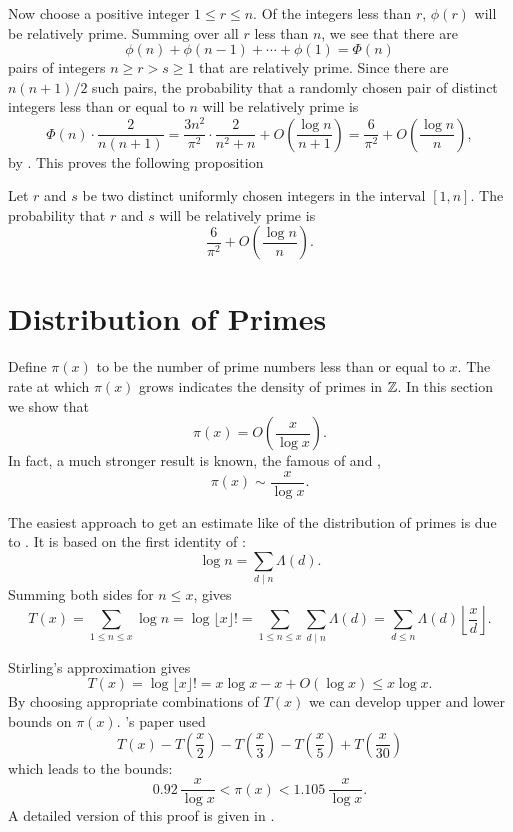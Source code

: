 Now choose a positive integer $1 \le r \le n$.  Of the integers less than
$r$, $\phi(r)$ will be relatively prime.  Summing over all $r$ less
than $n$, we see that there are 
\[
\phi(n) + \phi(n-1) + \cdots + \phi(1) = \Phi(n)
\]
pairs of integers $n \ge r > s \ge 1$ that are relatively prime.  Since
there are $n(n+1)/2$ such pairs, the probability that a randomly chosen
pair of distinct integers less than or equal to $n$ will be relatively
prime is
\[
\Phi(n) \cdot \frac{2}{n(n+1)} 
  = \frac{3 n^2}{\pi^2} \cdot \frac{2}{n^2+n} 
      + O\left(\frac{\log n}{n+1}\right)
  = \frac{6}{\pi^2}+ O\left(\frac{\log n}{n}\right),
\]
by .
This proves the following proposition
\begin{proposition}
\label{RelPrime:Pairs:Prop}
Let $r$ and $s$ be two distinct uniformly chosen integers in the
interval $[1, n]$.  The probability that $r$ and $s$ will be
relatively prime is
\[
\frac{6}{\pi^2}+ O\left(\frac{\log n}{n}\right).
\]
\end{proposition}

\section{Distribution of Primes}
\label{Prime:Dist:Sec}

Define $\pi(x)$ to be the number of prime numbers less than or equal
to $x$.  The
rate at which $\pi(x)$ grows indicates the density of primes in $\mathbb{Z}$.
In this section we show that 
\begin{equation} \label{Prime:Asymp:Eq}
\pi(x) = O\left(\frac{x}{\log x}\right).
\end{equation}
In fact, a much stronger result is known, the famous  of {\Hadamard} and {\ValleePoussin},
\[
\pi(x) \sim \frac{x}{\log x}.
\]

The easiest approach to get an estimate like 
of the distribution of primes is due to {\Chebyshev}.  It is based on
the first identity of :
\[
\log n  = \sum_{d \mid n} \Lambda (d).
\]
Summing both sides for $n \le x$, gives
\[
T(x) = \sum_{1\le n \le x}\log n = \log \lfloor x \rfloor !
= \sum_{1\le n \le x}\sum_{d\mid n} \Lambda(d)
= \sum_{d \le n}\Lambda(d) \left\lfloor\frac{x}{d}\right\rfloor.
\]

Stirling's approximation  gives
\begin{equation} \label{TStirlingApprox:Eq}
T(x) = \log \lfloor
x\rfloor! = x \log x - x + O(\log x) \le x \log x.
\end{equation}
By choosing appropriate combinations of $T(x)$ we can develop upper
and lower bounds on $\pi(x)$.  {\Chebyshev}'s paper used
\[
T(x) - T(\frac{x}{2}) - T(\frac{x}{3}) - T(\frac{x}{5})
 + T(\frac{x}{30})
\]
which leads to the bounds:
\[
0.92 \, \frac{x}{\log x} < \pi(x) < 1.105 \, \frac{x}{\log x}.
\]
A detailed version of this proof is given in {\LandauE}
\cite{Landau:Primzahlen}.  

